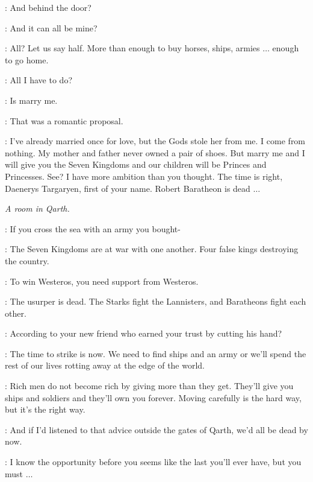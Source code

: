 
\DAENERYS: And behind the door? 


\DAENERYS: And it can all be mine? 

\XARO: All? Let us say half. More than enough to buy horses, ships, armies $\ldots$ enough to go home. 

\DAENERYS: All I have to do? 

\XARO: Is marry me. 

\DAENERYS: That was a romantic proposal. 

\XARO: I've already married once for love, but the Gods stole her from me. I come from nothing. My mother and father never owned a pair of shoes. But marry me and I will give you the Seven Kingdoms and our children will be Princes and Princesses. See? I have more ambition than you thought. The time is right, Daenerys Targaryen, first of your name. Robert Baratheon is dead $\ldots$ 



\scene

\textit{A room in Qarth.} 


\JORAH: If you cross the sea with an army you bought- 

\DAENERYS: The Seven Kingdoms are at war with one another. Four false kings destroying the country. 

\JORAH: To win Westeros, you need support from Westeros. 

\DAENERYS: The usurper is dead. The Starks fight the Lannisters, and Baratheons fight each other. 

\JORAH: According to your new friend who earned your trust by cutting his hand? 

\DAENERYS: The time to strike is now. We need to find ships and an army or we'll spend the rest of our lives rotting away at the edge of the world. 

\JORAH: Rich men do not become rich by giving more than they get. They'll give you ships and soldiers and they'll own you forever. Moving carefully is the hard way, but it's the right way. 

\DAENERYS: And if I'd listened to that advice outside the gates of Qarth, we'd all be dead by now. 

\JORAH: I know the opportunity before you seems like the last you'll ever have, but you must $\ldots$  


